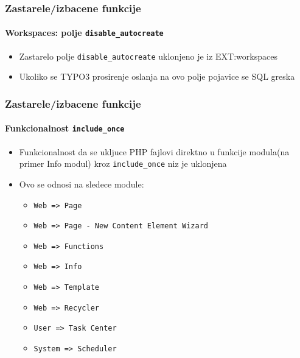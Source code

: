 \begin{frame}[fragile]
	\frametitle{Zastarele/izbacene funkcije}
	\framesubtitle{Workspaces: polje \texttt{disable\_autocreate}}

	\begin{itemize}
		\item Zastarelo polje \texttt{disable\_autocreate} uklonjeno je iz EXT:workspaces
		\item Ukoliko se TYPO3 prosirenje oslanja na ovo polje pojavice se SQL greska
	\end{itemize}

\end{frame}


\begin{frame}[fragile]
	\frametitle{Zastarele/izbacene funkcije}
	\framesubtitle{Funkcionalnost \texttt{include\_once}}

	\begin{itemize}

		\item Funkcionalnost da se ukljuce PHP fajlovi direktno u funkcije modula(na primer Info modul)
			kroz \texttt{include\_once} niz je uklonjena

		\item Ovo se odnosi na sledece module:

			\begin{itemize}
				\item \texttt{Web => Page}
				\item \texttt{Web => Page - New Content Element Wizard}
				\item \texttt{Web => Functions}
				\item \texttt{Web => Info}
				\item \texttt{Web => Template}
				\item \texttt{Web => Recycler}
				\item \texttt{User => Task Center}
				\item \texttt{System => Scheduler}
			\end{itemize}

	\end{itemize}

\end{frame}

